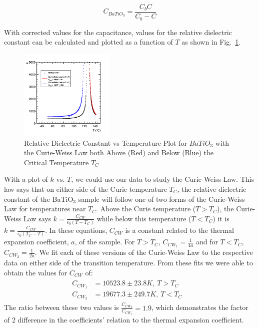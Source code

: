 \documentclass[%
 reprint,
 amsmath,amssymb,
 aps,
 pra,
]{revtex4-1}
\begin{document}
\begin{equation}\label{Eq:CapCorrection}
C_{BaTiO_{3}} = \frac{C_{b}C}{C_{b} - C}
\end{equation}

\noindent With corrected values for the capacitance, values for the relative dielectric constant can be calculated and plotted as a function of $T$ as shown in Fig.~\ref{Fig:kvT}.

\begin{figure}[H]
	\centering
	\includegraphics[width=0.4\textwidth]{BaTiO3_kvT.png}
	\caption{Relative Dielectric Constant vs Temperature Plot for $BaTiO_{3}$ with the Curie-Weiss Law both Above (Red) and Below (Blue) the Critical Temperature $T_{C}$}
	\label{Fig:kvT}
\end{figure}

With a plot of $k$ vs. $T$, we could use our data to study the Curie-Weiss Law. This law says that on either side of the Curie temperature $T_{C}$, the relative dielectric constant of the BaTiO$_{3}$ sample will follow one of two forms of the Curie-Weiss Law for temperatures near $T_{C}$. Above the Curie temperature ($T > T_{C}$), the Curie-Weiss Law says $k = \frac{C_{CW}}{\epsilon_{0} (T-T_{C})}$ while below this temperature ($T < T_{C}$) it is $k = \frac{C_{CW}}{\epsilon_{0} (T_{C} - T)}$. In these equations, $C_{CW}$ is a constant related to the thermal expansion coefficient, $a$, of the sample. For $T > T_{C}$, $C_{CW_{1}} = \frac{1}{4a}$ and for $T < T_{C}$, $C_{CW_{2}} = \frac{1}{2a}$. We fit each of these versions of the Curie-Weiss Law to the respective data on either side of the transition temperature. From these fits we were able to obtain the values for $C_{CW}$ of:
\begin{gather*}
\begin{align}
C_{CW_{1}} & = 10523.8 \pm 23.8 K,  ~T > T_{C} ~~~~~~ \nonumber \\
C_{CW_{2}} & = 19677.3 \pm 249.7 K, ~T < T_{C} \nonumber
\end{align} 
\end{gather*}
\noindent The ratio between these two values is $\frac{C_{CW_{2}}}{C_{CW_{1}}} = 1.9$, which demonstrates the factor of 2 difference in the coefficients' relation to the thermal expansion coefficient.
\end{document}
